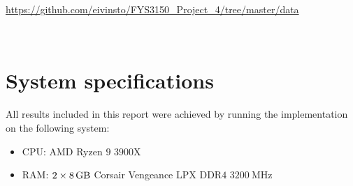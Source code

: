 \documentclass[reprint,english,notitlepage]{revtex4-1}  %
\begin{document}
\url{https://github.com/eivinsto/FYS3150_Project_4/tree/master/data}

~
\newpage
\section{System specifications} \label{C}
All results included in this report were achieved by running the implementation on the following system:

\begin{itemize}
	\item CPU: AMD Ryzen \(9\) \(3900\)X
	\item RAM: \(2\times\SI{8}{\giga\byte}\) Corsair Vengeance LPX DDR\(4\) \(\SI{3200}{\mega\hertz}\)
\end{itemize}
\end{document}
